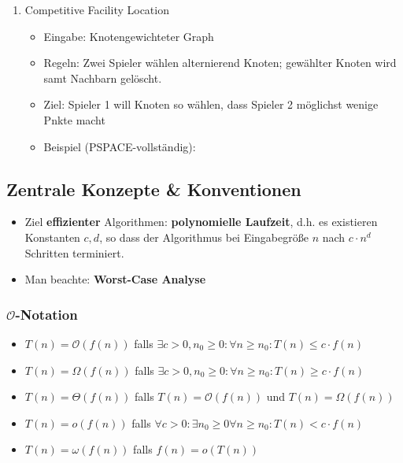 \documentclass{scrartcl}
\begin{document}
\begin{enumerate}
	\item Competitive Facility Location
	\begin{itemize}
		\item Eingabe: Knotengewichteter Graph
		\item Regeln: Zwei Spieler wählen alternierend Knoten; gewählter Knoten wird samt Nachbarn gelöscht.
		\item Ziel: Spieler 1 will Knoten so wählen, dass Spieler 2 möglichst wenige Pnkte macht
		\item Beispiel (PSPACE-vollständig): \\
		
	\end{itemize}
\end{enumerate}

\subsection{Zentrale Konzepte \& Konventionen}

\begin{itemize}
	\item Ziel \textbf{effizienter} Algorithmen: \textbf{polynomielle Laufzeit}, d.h. es existieren Konstanten $ c,d $, so dass der Algorithmus bei Eingabegröße $ n $ nach $ c \cdot n^d $ Schritten terminiert.
	\item Man beachte: \textbf{Worst-Case Analyse}
\end{itemize}

\subsubsection{$ \mathcal{O} $-Notation}

\begin{itemize}
	\item $ T(n) = \mathcal{O}(f(n)) $ falls $ \exists c > 0, n_0 \geq 0: \forall n \geq n_0 : T(n) \leq c \cdot f(n) $ \\
	
	\item $ T(n) = \Omega(f(n)) $ falls $ \exists c > 0, n_0 \geq 0 : \forall n \geq n_0: T(n) \geq c \cdot f(n) $
	\item $ T(n) = \Theta(f(n)) $ falls $ T(n) = \mathcal{O}(f(n)) $ und $ T(n) = \Omega(f(n)) $ \\
	
	\item $ T(n) = o(f(n)) $ falls $ \forall c > 0 : \exists n_0 \geq 0 \forall n \geq n_0 : T(n) < c \cdot f(n) $
	\item $ T(n) = \omega(f(n)) $ falls $ f(n) = o(T(n)) $
\end{itemize}
\end{document}
